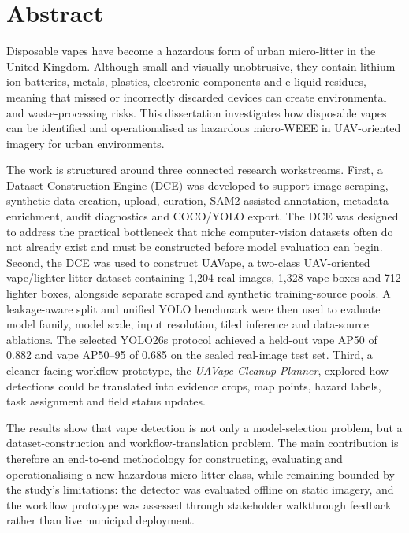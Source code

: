 \section*{Abstract}

Disposable vapes have become a hazardous form of urban micro-litter in the United Kingdom. Although small and visually unobtrusive, they contain lithium-ion batteries, metals, plastics, electronic components and e-liquid residues, meaning that missed or incorrectly discarded devices can create environmental and waste-processing risks. This dissertation investigates how disposable vapes can be identified and operationalised as hazardous micro-WEEE in UAV-oriented imagery for urban environments.

The work is structured around three connected research workstreams. First, a Dataset Construction Engine (DCE) was developed to support image scraping, synthetic data creation, upload, curation, SAM2-assisted annotation, metadata enrichment, audit diagnostics and COCO/YOLO export. The DCE was designed to address the practical bottleneck that niche computer-vision datasets often do not already exist and must be constructed before model evaluation can begin. Second, the DCE was used to construct UAVape, a two-class UAV-oriented vape/lighter litter dataset containing 1,204 real images, 1,328 vape boxes and 712 lighter boxes, alongside separate scraped and synthetic training-source pools. A leakage-aware split and unified YOLO benchmark were then used to evaluate model family, model scale, input resolution, tiled inference and data-source ablations. The selected YOLO26s protocol achieved a held-out vape AP50 of 0.882 and vape AP50--95 of 0.685 on the sealed real-image test set. Third, a cleaner-facing workflow prototype, the \textit{UAVape Cleanup Planner}, explored how detections could be translated into evidence crops, map points, hazard labels, task assignment and field status updates.

The results show that vape detection is not only a model-selection problem, but a dataset-construction and workflow-translation problem. The main contribution is therefore an end-to-end methodology for constructing, evaluating and operationalising a new hazardous micro-litter class, while remaining bounded by the study's limitations: the detector was evaluated offline on static imagery, and the workflow prototype was assessed through stakeholder walkthrough feedback rather than live municipal deployment.
